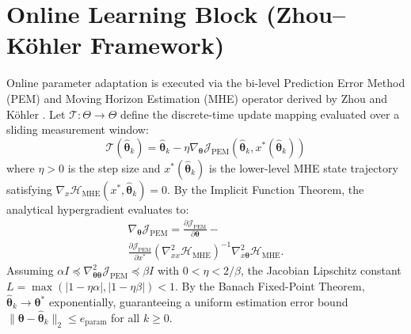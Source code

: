 \documentclass[journal]{IEEEtran}
\begin{document}
\section{Online Learning Block (Zhou--K\"ohler Framework)}
Online parameter adaptation is executed via the bi-level Prediction Error Method (PEM) and Moving Horizon Estimation (MHE) operator derived by Zhou and K\"ohler \cite{zhou24}. Let $\mathcal{T}: \Theta \rightarrow \Theta$ define the discrete-time update mapping evaluated over a sliding measurement window:
\begin{equation}
    \mathcal{T}(\hat{\bm{\theta}}_k) = \hat{\bm{\theta}}_k - \eta \nabla_{\bm{\theta}} \mathcal{J}_{\text{PEM}}(\hat{\bm{\theta}}_k, x^*(\hat{\bm{\theta}}_k))
\end{equation}
where $\eta > 0$ is the step size and $x^*(\hat{\bm{\theta}}_k)$ is the lower-level MHE state trajectory satisfying $\nabla_x \mathcal{H}_{\text{MHE}}(x^*, \hat{\bm{\theta}}_k) = 0$. By the Implicit Function Theorem, the analytical hypergradient evaluates to:
\begin{multline}
    \nabla_{\bm{\theta}} \mathcal{J}_{\text{PEM}} = \frac{\partial \mathcal{J}_{\text{PEM}}}{\partial \bm{\theta}} - \\
    \frac{\partial \mathcal{J}_{\text{PEM}}}{\partial x^*} \left( \nabla^2_{xx} \mathcal{H}_{\text{MHE}} \right)^{-1} \nabla^2_{x\bm{\theta}} \mathcal{H}_{\text{MHE}}.
\end{multline}
Assuming $\alpha I \preceq \nabla^2_{\bm{\theta}\bm{\theta}} \mathcal{J}_{\text{PEM}} \preceq \beta I$ with $0 < \eta < 2/\beta$, the Jacobian Lipschitz constant $L = \max(|1 - \eta\alpha|, |1 - \eta\beta|) < 1$. By the Banach Fixed-Point Theorem, $\hat{\bm{\theta}}_k \rightarrow \bm{\theta}^*$ exponentially, guaranteeing a uniform estimation error bound $\|\bm{\theta} - \hat{\bm{\theta}}_k\|_2 \le e_{\text{param}}$ for all $k \ge 0$.
\end{document}
